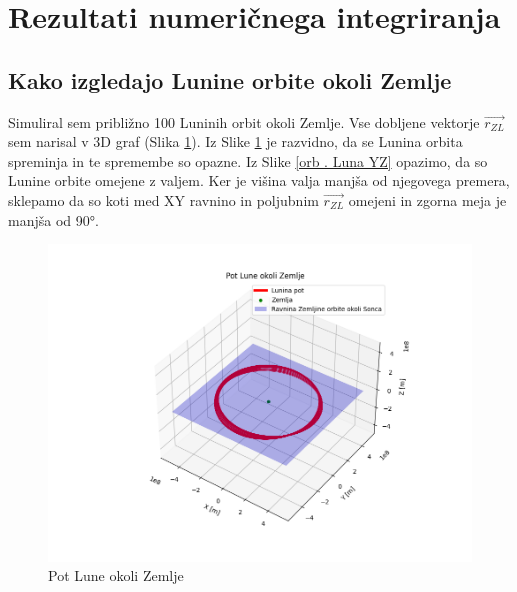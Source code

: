 \documentclass[titlepage,12pt,a4paper]{article}
\begin{document}
\section{Rezultati numeričnega integriranja}
\subsection{Kako izgledajo Lunine orbite okoli Zemlje}
Simuliral sem približno 100 Luninih orbit okoli Zemlje. Vse dobljene vektorje $\overrightarrow{r_{ZL}}$ sem narisal v 3D graf (Slika \ref{orb . Luna vse strani}). Iz Slike \ref{orb . Luna vse strani} je razvidno, da se Lunina orbita spreminja in te spremembe so opazne. Iz Slike \ref{orb . Luna YZ} opazimo, da so Lunine orbite omejene z valjem. Ker je višina valja manjša od njegovega premera, sklepamo da so koti med XY ravnino in poljubnim $\overrightarrow{r_{ZL}}$ omejeni in zgorna meja je manjša od 90°.

\begin{figure}[H]
\begin{center}
\includegraphics[scale=0.65]{Slike/Orbita_Lune_vseStrani.png}
\caption{Pot Lune okoli Zemlje}
\label{orb . Luna vse strani}
\end{center}
\end{figure}
\end{document}
